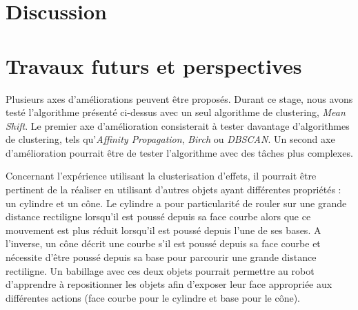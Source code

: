 \documentclass{llncs}
\begin{document}

\section{Discussion}







\section{Travaux futurs et perspectives}

Plusieurs axes d'améliorations peuvent être proposés. Durant ce stage, nous avons testé l'algorithme présenté ci-dessus avec un seul algorithme de clustering, \textit{Mean Shift}. Le premier axe d'amélioration consisterait à tester davantage d'algorithmes de clustering, tels qu'\textit{Affinity Propagation}, \textit{Birch} ou \textit{DBSCAN}. Un second axe d'amélioration pourrait être de tester l'algorithme avec des tâches plus complexes.

Concernant l'expérience utilisant la clusterisation d'effets, il pourrait être pertinent de la réaliser en utilisant d'autres objets ayant différentes propriétés : un cylindre et un cône. Le cylindre a pour particularité de rouler sur une grande distance rectiligne lorsqu'il est poussé depuis sa face courbe alors que ce mouvement est plus réduit lorsqu'il est poussé depuis l'une de ses bases. A l'inverse, un cône décrit une courbe s'il est poussé depuis sa face courbe et nécessite d'être poussé depuis sa base pour parcourir une grande distance rectiligne. Un babillage avec ces deux objets pourrait permettre au robot d'apprendre à repositionner les objets afin d'exposer leur face appropriée aux différentes actions (face courbe pour le cylindre et base pour le cône).
\end{document}
